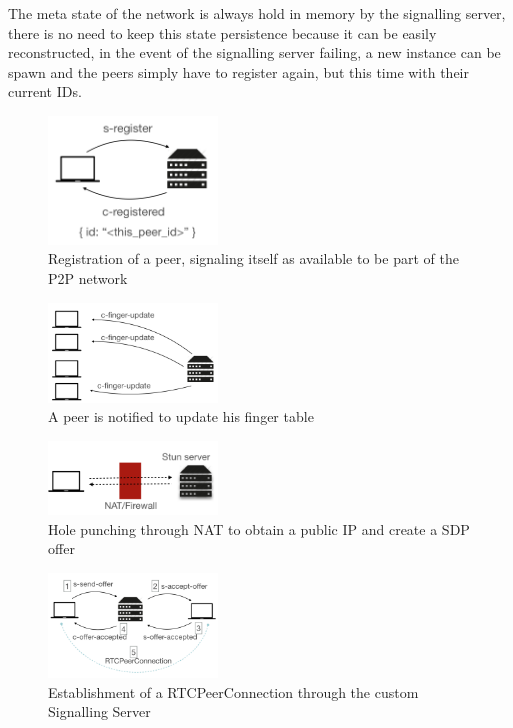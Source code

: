 The meta state of the network is always hold in memory by the signalling server, there is no need to keep this state persistence because it can be easily reconstructed, in the event of the signalling server failing, a new instance can be spawn and the peers simply have to register again, but this time with their current IDs.

\begin{figure}[h!]
  \centering
  \includegraphics[width=0.4\textwidth]{figs/1-peer-registers}
  \caption{Registration of a peer, signaling itself as available to be part of the P2P network}
  \label{fig:1-p-r}
\end{figure}

\begin{figure}[h!]
  \centering
  \includegraphics[width=0.4\textwidth]{figs/2-peers-notified}
  \caption{A peer is notified to update his finger table}
  \label{fig:2-p-n}
\end{figure}

\begin{figure}[h!]
  \centering
  \includegraphics[width=0.4\textwidth]{figs/3-peer-stun}
  \caption{Hole punching through NAT to obtain a public IP and create a SDP offer}
  \label{fig:3-p-s}
\end{figure}

\begin{figure}[h!]
  \centering
  \includegraphics[width=0.4\textwidth]{figs/4-peer-connect}
  \caption{Establishment of a RTCPeerConnection through the custom Signalling Server}
  \label{fig:4-p-c}
\end{figure}


